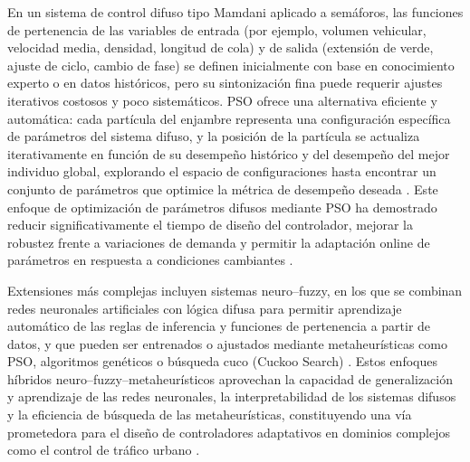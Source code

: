 En un sistema de control difuso tipo Mamdani aplicado a semáforos, las funciones de pertenencia de las variables de entrada (por ejemplo, volumen vehicular, velocidad media, densidad, longitud de cola) y de salida (extensión de verde, ajuste de ciclo, cambio de fase) se definen inicialmente con base en conocimiento experto o en datos históricos, pero su sintonización fina puede requerir ajustes iterativos costosos y poco sistemáticos. PSO ofrece una alternativa eficiente y automática: cada partícula del enjambre representa una configuración específica de parámetros del sistema difuso, y la posición de la partícula se actualiza iterativamente en función de su desempeño histórico y del desempeño del mejor individuo global, explorando el espacio de configuraciones hasta encontrar un conjunto de parámetros que optimice la métrica de desempeño deseada \cite{kennedy1995particle,li2016pso,goncalo2022tuning}. Este enfoque de optimización de parámetros difusos mediante PSO ha demostrado reducir significativamente el tiempo de diseño del controlador, mejorar la robustez frente a variaciones de demanda y permitir la adaptación online de parámetros en respuesta a condiciones cambiantes \cite{dellorco2013harmony,azimirad2010novel}.

Extensiones más complejas incluyen sistemas neuro--fuzzy, en los que se combinan redes neuronales artificiales con lógica difusa para permitir aprendizaje automático de las reglas de inferencia y funciones de pertenencia a partir de datos, y que pueden ser entrenados o ajustados mediante metaheurísticas como PSO, algoritmos genéticos o búsqueda cuco (Cuckoo Search) \cite{nawi2013fuzzy}. Estos enfoques híbridos neuro--fuzzy--metaheurísticos aprovechan la capacidad de generalización y aprendizaje de las redes neuronales, la interpretabilidad de los sistemas difusos y la eficiencia de búsqueda de las metaheurísticas, constituyendo una vía prometedora para el diseño de controladores adaptativos en dominios complejos como el control de tráfico urbano \cite{papageorgiou2003review,yadav2021fuzzy}.

